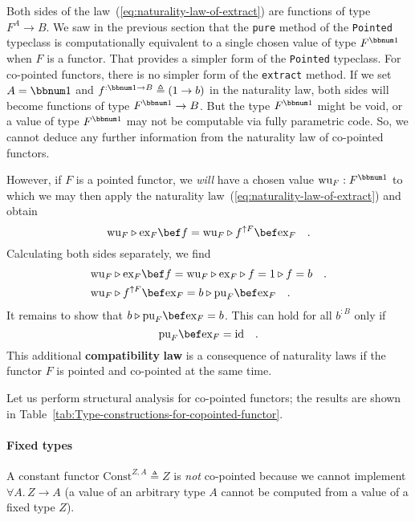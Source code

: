 Both sides of the law~(\ref{eq:naturality-law-of-extract}) are functions
of type $F^{A}\rightarrow B$. We saw in the previous section that
the \lstinline!pure! method of the \lstinline!Pointed! typeclass
is computationally equivalent to a single chosen value of type $F^{\bbnum 1}$
when $F$ is a functor. That provides a simpler form of the \lstinline!Pointed!
typeclass. For co-pointed functors, there is no simpler form of the
\lstinline!extract! method. If we set $A=\bbnum 1$ and $f^{:\bbnum 1\rightarrow B}\triangleq(1\rightarrow b)$
in the naturality law, both sides will become functions of type $F^{\bbnum 1}\rightarrow B$.
But the type $F^{\bbnum 1}$ might be void, or a value of type $F^{\bbnum 1}$
may not be computable via fully parametric code. So, we cannot deduce
any further information from the naturality law of co-pointed functors. 

However, if $F$ is a pointed functor, we \emph{will} have a chosen
value $\text{wu}_{F}:F^{\bbnum 1}$ to which we may then apply the
naturality law~(\ref{eq:naturality-law-of-extract}) and obtain
\[
\text{wu}_{F}\triangleright\text{ex}_{F}\bef f=\text{wu}_{F}\triangleright f^{\uparrow F}\bef\text{ex}_{F}\quad.
\]
Calculating both sides separately, we find
\begin{align*}
 & \text{wu}_{F}\triangleright\text{ex}_{F}\bef f=\text{wu}_{F}\triangleright\text{ex}_{F}\triangleright f=1\triangleright f=b\quad.\\
 & \text{wu}_{F}\triangleright f^{\uparrow F}\bef\text{ex}_{F}=b\triangleright\text{pu}_{F}\bef\text{ex}_{F}\quad.
\end{align*}
It remains to show that $b\triangleright\text{pu}_{F}\bef\text{ex}_{F}=b$.
This can hold for all $b^{:B}$ only if 
\[
\text{pu}_{F}\bef\text{ex}_{F}=\text{id}\quad.
\]
This additional \textbf{compatibility} \textbf{law}
is a consequence of naturality laws if the functor $F$ is pointed
and co-pointed at the same time.

Let us perform structural analysis for co-pointed functors; the results
are shown in Table~\ref{tab:Type-constructions-for-copointed-functor}.

\paragraph{Fixed types}

A constant functor $\text{Const}^{Z,A}\triangleq Z$ is \emph{not}
co-pointed because we cannot implement $\forall A.\,Z\rightarrow A$
(a value of an arbitrary type $A$ cannot be computed from a value
of a fixed type $Z$).

